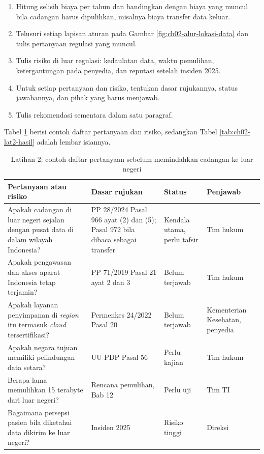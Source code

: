 \begin{enumerate}
  \item Hitung selisih biaya per tahun dan bandingkan dengan biaya yang muncul bila
        cadangan harus dipulihkan, misalnya biaya transfer data keluar.
  \item Telusuri setiap lapisan aturan pada Gambar \ref{fig:ch02-alur-lokasi-data} dan
        tulis pertanyaan regulasi yang muncul.
  \item Tulis risiko di luar regulasi: kedaulatan data, waktu pemulihan, ketergantungan
        pada penyedia, dan reputasi setelah insiden 2025.
  \item Untuk setiap pertanyaan dan risiko, tentukan dasar rujukannya, status jawabannya,
        dan pihak yang harus menjawab.
  \item Tulis rekomendasi sementara dalam satu paragraf.
\end{enumerate}

Tabel \ref{tab:ch02-lat2-contoh} berisi contoh daftar pertanyaan dan risiko, sedangkan
Tabel \ref{tab:ch02-lat2-hasil} adalah lembar isiannya.

\begin{table}[!htb]
  \centering
  \caption{Latihan 2: contoh daftar pertanyaan sebelum memindahkan cadangan ke luar
           negeri}
  \label{tab:ch02-lat2-contoh}
  \small
  \begin{tabularx}{\textwidth}{>{\raggedright\arraybackslash}X
      >{\raggedright\arraybackslash}p{2.6cm} >{\raggedright\arraybackslash}p{2.0cm}
      >{\raggedright\arraybackslash}p{1.9cm}}
    \hline
    \textbf{Pertanyaan atau risiko} & \textbf{Dasar rujukan} & \textbf{Status} &
      \textbf{Penjawab} \\
    \hline
    Apakah cadangan di luar negeri sejalan dengan pusat data di dalam wilayah Indonesia? &
      PP 28/2024 Pasal 966 ayat (2) dan (5); Pasal 972 bila dibaca sebagai transfer & Kendala
      utama, perlu tafsir & Tim hukum \\
    \hline
    Apakah pengawasan dan akses aparat Indonesia tetap terjamin? & PP 71/2019 Pasal 21 ayat
      2 dan 3 & Belum terjawab & Tim hukum \\
    \hline
    Apakah layanan penyimpanan di \textit{region} itu termasuk \textit{cloud}
      tersertifikasi? & Permenkes 24/2022 Pasal 20 & Belum terjawab & Kementerian
      Kesehatan, penyedia \\
    \hline
    Apakah negara tujuan memiliki pelindungan data setara? & UU PDP Pasal 56 & Perlu kajian &
      Tim hukum \\
    \hline
    Berapa lama memulihkan 15 terabyte dari luar negeri? & Rencana pemulihan, Bab 12 & Perlu
      uji & Tim TI \\
    \hline
    Bagaimana persepsi pasien bila diketahui data dikirim ke luar negeri? & Insiden 2025 &
      Risiko tinggi & Direksi \\
    \hline
  \end{tabularx}
\end{table}

